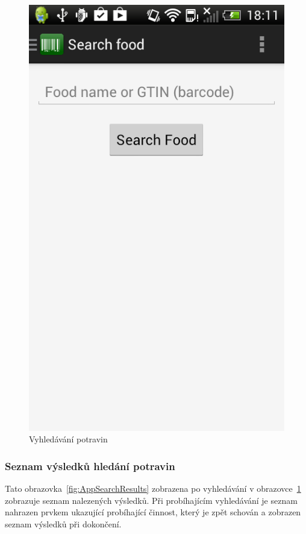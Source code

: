 \documentclass[thesis=B,czech]{FITthesis}[2013/10/20]
\begin{document}
\begin{figure}[H]
  \centering
  \includegraphics[scale=0.4]{screenshots/app_search.png}
  \caption{Vyhledávání potravin}
  \label{fig:AppSearch}
\end{figure}

\clearpage

\subsubsection{Seznam výsledků hledání potravin}

Tato obrazovka~\ref{fig:AppSearchResults} zobrazena po vyhledávání v obrazovce~\ref{fig:AppSearch} zobrazuje seznam nalezených výsledků. Při probíhajícím vyhledávání je seznam nahrazen prvkem ukazující probíhající činnost, který je zpět schován a zobrazen seznam výsledků při dokončení.
\end{document}

